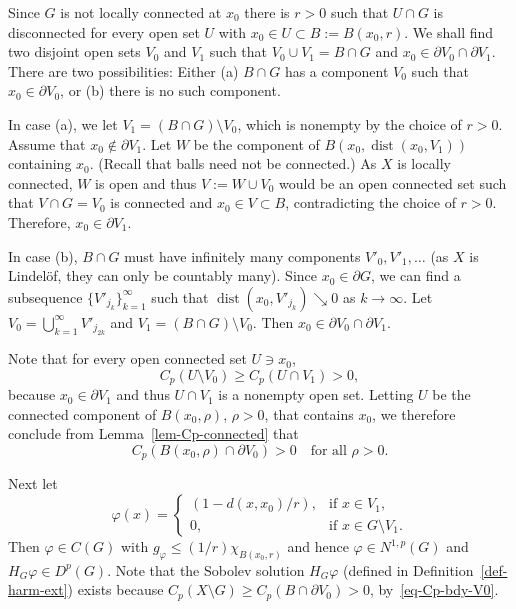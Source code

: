\documentclass[a4paper,twoside]{article}
\makeatletter
\theoremstyle{propositional}
\theoremstyle{descriptive}
\theoremstyle{remarkstyle}
\renewenvironment{proof}[1][\proofname]{\par
  \pushQED{\qed}%
  \normalfont
  \trivlist
  \item[\hskip\labelsep
        \itshape
    #1\@addpunct{.}]\ignorespaces
}{%
  \popQED\endtrivlist\@endpefalse
}
\newcommand{\setm}{\setminus}
\newcommand{\Cp}{{C_p}}
\DeclareMathOperator{\dist}{dist}
\newcommand{\bdry}{\partial}
\newcommand{\bdy}{\bdry}
\renewcommand{\phi}{\varphi}
\newcommand{\Np}{N^{1,p}}
\newcommand{\Dp}{D^{p}}
\numberwithin{equation}{section}
\makeatother
\begin{document}
\begin{proof}[Proof of Proposition~\ref{prop-not-locconn}]
Since $G$ is not locally connected at $x_0$ there
is $r>0$ such that $U \cap G$ is disconnected for
every open set $U$ 
with $x_0 \in U \subset B:=B(x_0,r)$.
We shall
find two disjoint open sets $V_0$ and $V_1$ such 
that $V_0 \cup V_1 = B \cap G$ and $x_0\in \bdy V_0 \cap \bdy V_1$.
There are two possibilities:
Either 
(a) $B \cap G$ has a component $V_0$ such that $x_0 \in \bdy V_0$,
or (b) there is no such component.

In case (a), we let 
$V_1=(B\cap G) \setm V_0$, which is nonempty
by the choice of $r>0$.
Assume that $x_0 \notin \bdy V_1$.
Let $W$ be the component of $B(x_0,\dist(x_0,V_1))$ containing $x_0$.
(Recall that balls need not be connected.)
As $X$ is locally connected, $W$ is open and thus 
$V:=W \cup V_0$ would be
an open connected set such that 
$V \cap G=V_0$ is connected and  $x_0 \in V \subset B$,
contradicting the choice of $r>0$.
Therefore, $x_0 \in \bdy V_1$.

In case (b), $B \cap G$ must have infinitely many components 
$V'_0,V'_1,\dots$ (as $X$ is Lindel\"of, they  
can only be countably many).  
Since $x_0\in \bdy G$, we can find a subsequence $\{V'_{j_k}\}_{k=1}^\infty$
such that $\dist(x_0,V'_{j_k})\searrow0$ as $k\to\infty$. 
Let $V_0=\bigcup_{k=1}^\infty V'_{j_{2k}}$ and $V_1=(B \cap G)\setm V_0$.
Then $x_0 \in \bdy V_0\cap \bdy V_1$.

Note that for every open connected set $U\ni x_0$, 
\[
\Cp(U \setm V_0) \ge \Cp(U \cap V_1) >0,
\]
because $x_0\in \bdy V_1$ and thus $U \cap V_1$ is a nonempty
open set.
Letting $U$ be the connected component of $B(x_0,\rho)$, $\rho>0$,
that contains $x_0$,  we 
therefore conclude from Lemma~\ref{lem-Cp-connected} 
that 
\begin{equation} \label{eq-Cp-bdy-V0}
\Cp(B(x_0,\rho)\cap \bdy V_0)>0 \quad  \text{for all } \rho>0.
\end{equation}


Next let 
\[
   \phi(x)=\begin{cases}
   (1-d(x,x_0)/r), & \text{if } x \in V_1,\\
   0, & \text{if } x \in G \setm V_1.
   \end{cases}
\]
Then $\phi \in C(G)$ with $g_\phi\le (1/r) \chi_{B(x_0,r)}$
and hence $\phi \in \Np(G)$ and $H_G \phi \in \Dp(G)$.
Note that the Sobolev solution $H_G \phi$ 
(defined in Definition~\ref{def-harm-ext}) exists because 
$\Cp(X \setm G)\ge \Cp(B \cap \bdy V_0)>0$,
by~\eqref{eq-Cp-bdy-V0}. 


\end{proof}
\end{document}
